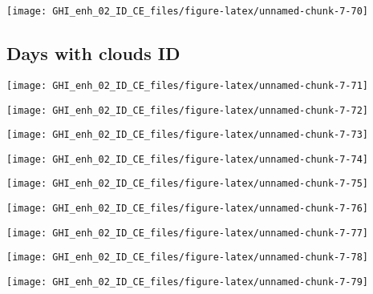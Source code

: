 \documentclass[
  10pt,
  a4paper,oneside]{article}
\begin{document}
\begin{center}\texttt{[image: GHI\_enh\_02\_ID\_CE\_files/figure-latex/unnamed-chunk-7-70]} \end{center}

\hypertarget{days-with-clouds-id}{%
\subsection{Days with clouds ID}\label{days-with-clouds-id}}

\begin{center}\texttt{[image: GHI\_enh\_02\_ID\_CE\_files/figure-latex/unnamed-chunk-7-71]} \end{center}

\begin{center}\texttt{[image: GHI\_enh\_02\_ID\_CE\_files/figure-latex/unnamed-chunk-7-72]} \end{center}

\begin{center}\texttt{[image: GHI\_enh\_02\_ID\_CE\_files/figure-latex/unnamed-chunk-7-73]} \end{center}

\begin{center}\texttt{[image: GHI\_enh\_02\_ID\_CE\_files/figure-latex/unnamed-chunk-7-74]} \end{center}

\begin{center}\texttt{[image: GHI\_enh\_02\_ID\_CE\_files/figure-latex/unnamed-chunk-7-75]} \end{center}

\begin{center}\texttt{[image: GHI\_enh\_02\_ID\_CE\_files/figure-latex/unnamed-chunk-7-76]} \end{center}

\begin{center}\texttt{[image: GHI\_enh\_02\_ID\_CE\_files/figure-latex/unnamed-chunk-7-77]} \end{center}

\begin{center}\texttt{[image: GHI\_enh\_02\_ID\_CE\_files/figure-latex/unnamed-chunk-7-78]} \end{center}

\begin{center}\texttt{[image: GHI\_enh\_02\_ID\_CE\_files/figure-latex/unnamed-chunk-7-79]} \end{center}
\end{document}
